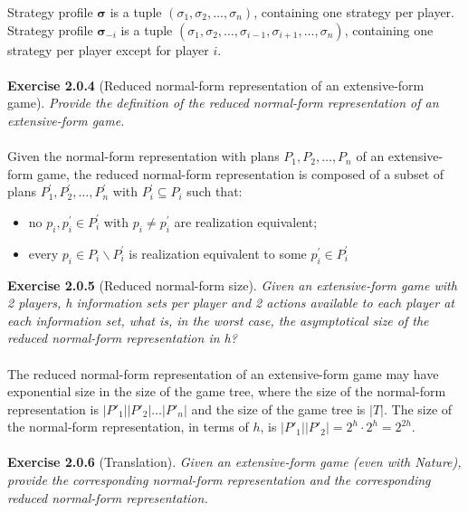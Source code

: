 Strategy profile $ \bm{\sigma} $ is a tuple $ (\sigma_{1}, \sigma_{2}, \ldots, \sigma_{n}) $, containing one strategy per player. Strategy profile $ \bm{\sigma}_{-i} $ is a tuple $ (\sigma_{1}, \sigma_{2}, \ldots, \sigma_{i-1}, \sigma_{i+1}, \ldots, \sigma_{n} ) $, containing one strategy per player except for player $i$.\\\\
\textbf{Exercise 2.0.4} (Reduced normal-form representation of an extensive-form game). \textit{Provide the definition of
the reduced normal-form representation of an extensive-form game.}\\\\
Given the normal-form representation with plans $ P_{1}, P_{2}, \ldots, P_{n} $ of an extensive-form game, the reduced normal-form representation is composed of a subset of plans $ P_{1}^{\prime}, P_{2}^{\prime}, \ldots, P_{n}^{\prime} $ with $ P_{i}^{\prime} \subseteq P_{i} $ such that:
\begin{itemize}
\item no $ p_{i}, p_{i}^{\prime} \in P_{i}^{\prime} $ with $ p_{i} \neq p_{i}^{\prime} $ are realization equivalent;
\item every $ p_{i} \in P_{i} \backslash P_{i}^{\prime} $ is realization equivalent to some $ p_{i}^{\prime} \in P_{i}^{\prime} $
\end{itemize}
\textbf{Exercise 2.0.5} (Reduced normal-form size). \textit{Given an extensive-form game with 2 players, h information
sets per player and 2 actions available to each player at each information set, what is, in the worst case, the
asymptotical size of the reduced normal-form representation in h?}\\\\
The reduced normal-form representation of an extensive-form game may have exponential size in the size of the game tree, where the size of the normal-form representation is $|P'_1| |P'_2| \ldots |P'_n|$ and the size of the game tree is $|T|$. The size of the normal-form representation, in terms of $h$, is $|P'_1||P'_2| = 2^h \cdot 2^h = 2^{2h}$.\\\\
\textbf{Exercise 2.0.6} (Translation). \textit{Given an extensive-form game (even with Nature), provide the corresponding normal-form representation and the corresponding reduced normal-form representation.}
